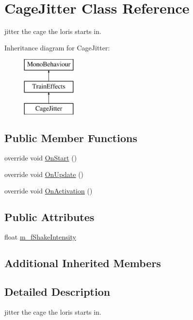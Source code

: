 \hypertarget{class_cage_jitter}{}\section{Cage\+Jitter Class Reference}
\label{class_cage_jitter}


jitter the cage the loris starts in.  


Inheritance diagram for Cage\+Jitter\+:\begin{figure}[H]
\begin{center}
\leavevmode
\includegraphics[height=3.000000cm]{class_cage_jitter}
\end{center}
\end{figure}
\subsection*{Public Member Functions}
\begin{DoxyCompactItemize}
\item 
override void \mbox{\hyperlink{class_cage_jitter_a5a4fcbd00fcb23ded787b25ad55ef56c}{On\+Start}} ()
\item 
override void \mbox{\hyperlink{class_cage_jitter_a0e84c06f7b50189264d001f5317fc50e}{On\+Update}} ()
\item 
override void \mbox{\hyperlink{class_cage_jitter_a31ae5a4505b942993f98a0141da454c2}{On\+Activation}} ()
\end{DoxyCompactItemize}
\subsection*{Public Attributes}
\begin{DoxyCompactItemize}
\item 
float \mbox{\hyperlink{class_cage_jitter_ac4025285173b994f6850804991153601}{m\+\_\+f\+Shake\+Intensity}}
\end{DoxyCompactItemize}
\subsection*{Additional Inherited Members}


\subsection{Detailed Description}
jitter the cage the loris starts in. 



